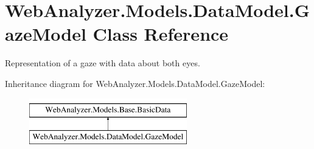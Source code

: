 \hypertarget{class_web_analyzer_1_1_models_1_1_data_model_1_1_gaze_model}{}\section{Web\+Analyzer.\+Models.\+Data\+Model.\+Gaze\+Model Class Reference}
\label{class_web_analyzer_1_1_models_1_1_data_model_1_1_gaze_model}


Representation of a gaze with data about both eyes.  


Inheritance diagram for Web\+Analyzer.\+Models.\+Data\+Model.\+Gaze\+Model\+:\begin{figure}[H]
\begin{center}
\leavevmode
\includegraphics[height=2.000000cm]{class_web_analyzer_1_1_models_1_1_data_model_1_1_gaze_model}
\end{center}
\end{figure}
